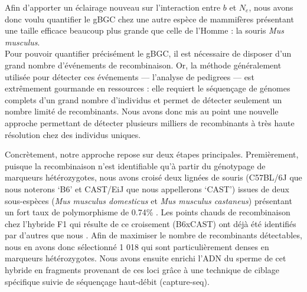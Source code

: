 {Afin d'apporter un éclairage nouveau sur l'interaction entre $b$ et $N_e$, nous avons donc voulu quantifier le gBGC chez une autre espèce de mammifères présentant une taille efficace beaucoup plus grande que celle de l'Homme \citep{geraldes2008inferring,phifer-rixey2012adaptive,davies2015factors}: la souris \textit{Mus musculus}.\\


Pour pouvoir quantifier précisément le gBGC, il est nécessaire de disposer d'un grand nombre d'événements de recombinaison.
Or, la méthode généralement utilisée pour détecter ces événements — l'analyse de pedigrees — est extrêmement gourmande en ressources : 
elle requiert le séquençage de génomes complets d'un grand nombre d'individus et permet de détecter seulement un nombre limité de recombinants.
Nous avons donc mis au point une nouvelle approche permettant de détecter plusieurs milliers de recombinants à très haute résolution chez des individus uniques.

Concrètement, notre approche repose sur deux étapes principales.
Premièrement, puisque la recombinaison n'est identifiable qu'à partir du génotypage de marqueurs hétérozygotes, nous avons croisé deux lignées de souris (C57BL/6J que nous noterons ‘B6’ et CAST/EiJ que nous appellerons ‘CAST’) issues de deux sous-espèces (\textit{Mus musculus domesticus} et \textit{Mus musculus castaneus}) présentant un fort taux de polymorphisme de 0.74\% \citep{keane2011mouse,yalcin2012nextgeneration}.
Les points chauds de recombinaison chez l'hybride F1 qui résulte de ce croisement (B6xCAST) ont déjà été identifiés par d'autres que nous \citep{baker2015prdm9}.
Afin de maximiser le nombre de recombinants détectables, nous en avons donc sélectionné 1 018 qui sont particulièrement denses en marqueurs hétérozygotes.
Nous avons ensuite enrichi l'ADN du sperme de cet hybride en fragments provenant de ces loci gr\^ace à une technique de ciblage spécifique suivie de séquençage haut-débit (capture-seq).

}

